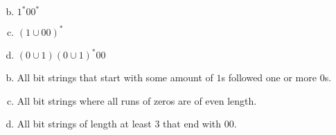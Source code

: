 \documentclass[../main.tex]{subfiles}
\begin{document}
\begin{enumerate}[a)]
	\setcounter{enumi}{1}
	\item {\boldmath $1^\ast00^\ast$}
	\setcounter{enumi}{3}
	\item {\boldmath $(1 \cup 00)^\ast$}
	\setcounter{enumi}{5}
	\item {\boldmath $(0 \cup 1)(0 \cup 1)^\ast00$}
\end{enumerate}

\solution
\begin{enumerate}[a)]
	\setcounter{enumi}{1}
	\item All bit strings that start with some amount of $1$s followed one or more $0$s.
	\setcounter{enumi}{3}
	\item All bit strings where all runs of zeros are of even length.
	\setcounter{enumi}{5}
	\item All bit strings of length at least $3$ that end with $00$.
\end{enumerate}
\end{document}
